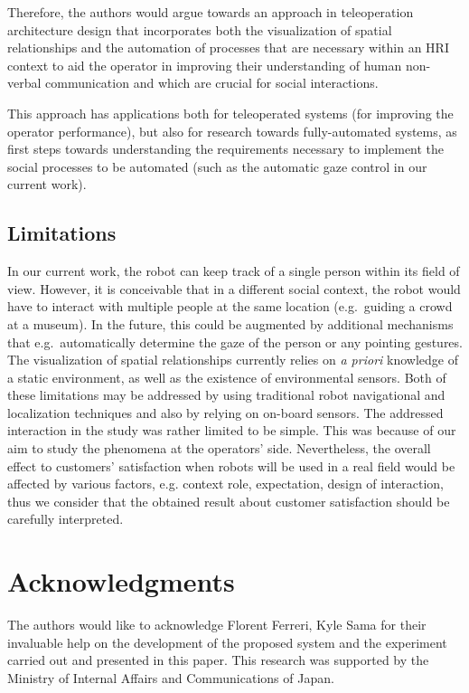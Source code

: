 \documentclass[journal]{IEEEtran}
\begin{document}
Therefore, the authors would argue towards an approach in teleoperation architecture design that incorporates both the visualization of spatial relationships and the automation of processes that are necessary within an HRI context to aid the operator in improving their understanding of human non-verbal communication and which are crucial for social interactions.

This approach has applications both for teleoperated systems (for improving the operator performance), but also for research towards fully-automated systems, as first steps towards understanding the requirements necessary to implement the social processes to be automated (such as the automatic gaze control in our current work).

\subsection{Limitations}
In our current work, the robot can keep track of a single person within its field of view.
However, it is conceivable that in a different social context, the robot would have to interact with multiple people at the same location (e.g.\ guiding a crowd at a museum).
In the future, this could be augmented by additional mechanisms that e.g.\ automatically determine the gaze of the person or any pointing gestures.
The visualization of spatial relationships currently relies on \emph{a priori} knowledge of a static environment, as well as the existence of environmental sensors.
Both of these limitations may be addressed by using traditional robot navigational and localization techniques and also by relying on on-board sensors.
The addressed interaction in the study was rather limited to be simple.
This was because of our aim to study the phenomena at the operators' side.
Nevertheless, the overall effect to customers' satisfaction when robots will be used in a real field would be affected by various factors, e.g. context role, expectation, design of interaction, thus we consider that the obtained result about customer satisfaction should be carefully interpreted.



\section{Acknowledgments}
The authors would like to acknowledge Florent Ferreri, Kyle Sama for their invaluable help on the development of the proposed system and the experiment carried out and presented in this paper.
This research was supported by the Ministry of Internal Affairs and Communications of Japan.
\end{document}
